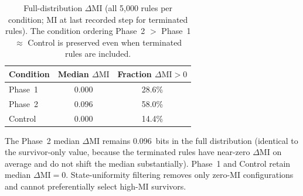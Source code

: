 \documentclass[letterpaper]{article}
\begin{document}
\begin{table}[htbp]
\centering
\caption{Full-distribution $\Delta\mathrm{MI}$ (all 5{,}000 rules per
condition; MI at last recorded step for terminated rules).
The condition ordering Phase~2 $>$ Phase~1 $\approx$ Control is preserved
even when terminated rules are included.}
\label{tab:full_dist_delta_mi}
\begin{tabular}{lcc}
\toprule
Condition & Median $\Delta\mathrm{MI}$ & Fraction $\Delta\mathrm{MI}>0$ \\
\midrule
Phase~1  & 0.000 & 28.6\% \\
Phase~2  & 0.096 & 58.0\% \\
Control  & 0.000 & 14.4\% \\
\bottomrule
\end{tabular}
\end{table}

The Phase~2 median $\Delta\mathrm{MI}$ remains 0.096~bits in the full
distribution (identical to the survivor-only value, because the terminated
rules have near-zero $\Delta\mathrm{MI}$ on average and do not shift the
median substantially).  Phase~1 and Control retain median $\Delta\mathrm{MI}=0$.
State-uniformity filtering removes only zero-MI configurations and cannot
preferentially select high-MI survivors.

\footnotesize


\end{document}
